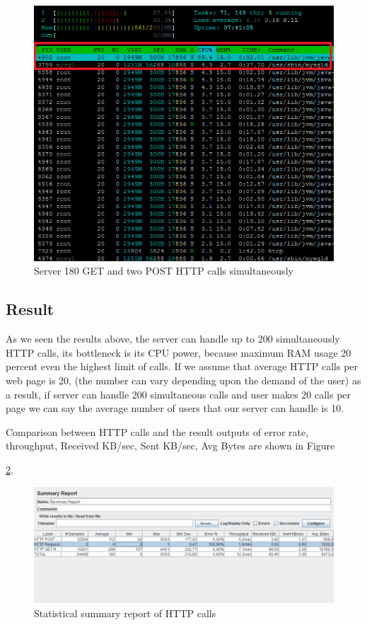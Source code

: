 \begin{figure}[!htbp]
\centering
\includegraphics[width=\textwidth]{projectChapters/images/180users2.png}
\caption{Server 180 GET and two POST HTTP calls simultaneously}
\label{fig:180user}
\end{figure}


\newpage
 
\subsection{Result}

As we seen the results above, the server can handle up to 200 simultaneously HTTP calls, its bottleneck is its CPU power, because maximum RAM usage 20 percent even the highest limit of calls. If we assume that average HTTP calls per web page is 20, (the number can vary depending upon the demand of the user) as a result, if server can handle 200 simultaneous calls and user makes 20 calls per page we can say the average number of users that our server can handle is 10.

Comparison between HTTP calls and the result outputs of error rate, throughput, Received KB/sec, Sent KB/sec, Avg Bytes are shown in Figure

\ref{fig:summaryReport}.

\begin{figure}[!htbp]
\centering
\includegraphics[width=\textwidth]{projectChapters/images/summaryReport.png}
\caption{Statistical summary report of HTTP calls}
\label{fig:summaryReport}
\end{figure}












